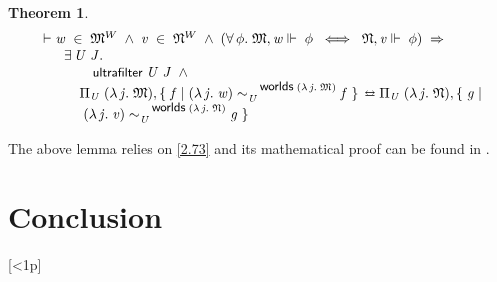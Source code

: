\documentclass{llncs}
\newtheorem{thm}{Theorem}[chapter]
\newenvironment{holmath}{\begin{displaymath}\begin{array}{l}}{\end{array}\end{displaymath}\ignorespacesafterend}
\renewcommand{\HOLConst}[1]{{\textsf{\upshape\small #1}}}
\renewcommand{\HOLTokenBar}{\mbox{$|$}}
\begin{document}
\begin{thm}
{\upshape\cite[Theorem 2.74, one direction]{Blackburn}}
\label{2.74}
\begin{holmath}
  \ensuremath{\HOLTokenTurnstile}\HOLFreeVar{w}\;\HOLSymConst{\HOLTokenIn{}}\;\HOLFreeVar{\ensuremath{\mathfrak{M}}}\HOLSymConst{\ensuremath{\sp{W}}}\;\HOLSymConst{\HOLTokenConj{}}\;\HOLFreeVar{v}\;\HOLSymConst{\HOLTokenIn{}}\;\HOLFreeVar{\ensuremath{\mathfrak{N}}}\HOLSymConst{\ensuremath{\sp{W}}}\;\HOLSymConst{\HOLTokenConj{}}\;(\HOLSymConst{\HOLTokenForall{}}\HOLBoundVar{\ensuremath{\phi}}.\;\HOLFreeVar{\ensuremath{\mathfrak{M}}},\HOLFreeVar{w}\ensuremath{\Vdash}\;\HOLBoundVar{\ensuremath{\phi}}\;\HOLSymConst{\HOLTokenEquiv{}}\;\HOLFreeVar{\ensuremath{\mathfrak{N}}},\HOLFreeVar{v}\ensuremath{\Vdash}\;\HOLBoundVar{\ensuremath{\phi}})\;\HOLSymConst{\HOLTokenImp{}}\\
\;\;\;\;\;\;\;\HOLSymConst{\HOLTokenExists{}}\HOLBoundVar{U}\;\HOLBoundVar{J}.\\
\;\;\;\;\;\;\;\;\;\;\;\HOLConst{ultrafilter}\;\HOLBoundVar{U}\;\HOLBoundVar{J}\;\HOLSymConst{\HOLTokenConj{}}\\
\;\;\;\;\;\;\;\;\;\;\;\Pi\sb{\HOLBoundVar{U}}\;(\HOLTokenLambda{}\HOLBoundVar{j}.\;\HOLFreeVar{\ensuremath{\mathfrak{M}}})\HOLSymConst{,}\HOLTokenLeftbrace{}\HOLBoundVar{f}\;\HOLTokenBar{}\;(\HOLTokenLambda{}\HOLBoundVar{j}.\;\HOLFreeVar{w})\sim\sb{\HOLBoundVar{U}}\sp{\HOLConst{worlds}\;(\HOLTokenLambda{}\HOLBoundVar{j}.\;\HOLFreeVar{\ensuremath{\mathfrak{M}}})}\HOLBoundVar{f}\HOLTokenRightbrace{}\HOLSymConst{\ensuremath{\leftrightarroweq}}\Pi\sb{\HOLBoundVar{U}}\;(\HOLTokenLambda{}\HOLBoundVar{j}.\;\HOLFreeVar{\ensuremath{\mathfrak{N}}})\HOLSymConst{,}\HOLTokenLeftbrace{}\HOLBoundVar{g}\;\HOLTokenBar{}\\
\;\;\;\;\;\;\;\;\;\;\;\;(\HOLTokenLambda{}\HOLBoundVar{j}.\;\HOLFreeVar{v})\sim\sb{\HOLBoundVar{U}}\sp{\HOLConst{worlds}\;(\HOLTokenLambda{}\HOLBoundVar{j}.\;\HOLFreeVar{\ensuremath{\mathfrak{N}}})}\HOLBoundVar{g}\HOLTokenRightbrace{}
\end{holmath}
\end{thm}
The above lemma relies on \ref{2.73} and its mathematical proof can be found in \cite{Blackburn}.  



\section{Conclusion}[<1p]



\end{document}
